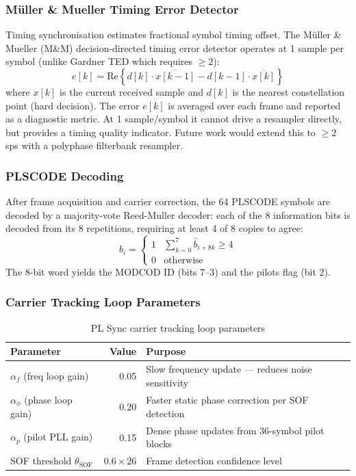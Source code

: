 \documentclass[12pt,a4paper]{report}
\begin{document}
\subsubsection{M{\"u}ller \& Mueller Timing Error Detector}

Timing synchronisation estimates fractional symbol timing offset. The Müller
\& Mueller (M\&M) decision-directed timing error detector operates at 1 sample
per symbol (unlike Gardner TED which requires $\geq 2$):
\begin{equation}
    e[k] = \mathrm{Re}\!\left\{ d[k] \cdot \overline{x[k-1]} - d[k-1] \cdot \overline{x[k]} \right\}
\end{equation}
where $x[k]$ is the current received sample and $d[k]$ is the nearest
constellation point (hard decision). The error $e[k]$ is averaged over each
frame and reported as a diagnostic metric. At 1 sample/symbol it cannot drive
a resampler directly, but provides a timing quality indicator. Future work
would extend this to $\geq 2$ sps with a polyphase filterbank resampler.

\subsubsection{PLSCODE Decoding}

After frame acquisition and carrier correction, the 64 PLSCODE symbols are
decoded by a majority-vote Reed-Muller decoder: each of the 8 information bits
is decoded from its 8 repetitions, requiring at least 4 of 8 copies to agree:
\begin{equation}
    b_i = \begin{cases} 1 & \sum_{k=0}^{7} \hat{b}_{i+8k} \geq 4 \\ 0 & \text{otherwise} \end{cases}
\end{equation}
The 8-bit word yields the MODCOD ID (bits 7--3) and the pilots flag (bit 2).

\subsubsection{Carrier Tracking Loop Parameters}

\begin{table}[H]
\centering
\caption{PL Sync carrier tracking loop parameters}
\label{tab:pll_params}
\begin{tabular}{lrl}
\toprule
\textbf{Parameter} & \textbf{Value} & \textbf{Purpose} \\
\midrule
$\alpha_f$ (freq loop gain)    & 0.05 & Slow frequency update --- reduces noise sensitivity \\
$\alpha_\phi$ (phase loop gain) & 0.20 & Faster static phase correction per SOF detection \\
$\alpha_p$ (pilot PLL gain)    & 0.15 & Dense phase updates from 36-symbol pilot blocks \\
SOF threshold $\theta_\text{SOF}$ & $0.6 \times 26$ & Frame detection confidence level \\
\bottomrule
\end{tabular}
\end{table}
\end{document}
